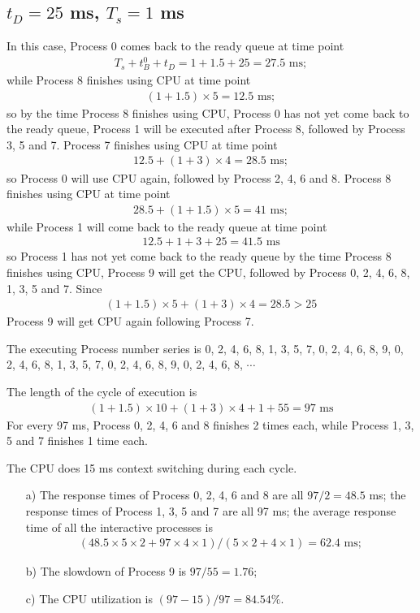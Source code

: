 \documentclass[12pt,letterpaper]{article}
\begin{document}
\subsection{$t_D=25$ ms, $T_s = 1$ ms}
In this case, Process 0 comes back to the ready queue at time point
\begin{eqnarray}
T_s+t_B^0+t_D=1+1.5+25=27.5\textrm{ ms};
\end{eqnarray}
while Process 8 finishes using CPU at time point 
\begin{eqnarray}
(1+1.5)\times5=12.5\textrm{ ms};
\end{eqnarray}
so by the time Process 8 finishes using CPU, Process 0 has not yet come back to the ready queue, Process 1 will be executed after Process 8, followed by Process 3, 5 and 7. Process 7 finishes using CPU at time point
\begin{eqnarray}
12.5+(1+3)\times4=28.5\textrm{ ms};
\end{eqnarray}
so Process 0 will use CPU again, followed by Process 2, 4, 6 and 8. Process 8 finishes using CPU at time point
\begin{eqnarray}
28.5+(1+1.5)\times5=41\textrm{ ms};
\end{eqnarray}
while Process 1 will come back to the ready queue at time point
\begin{eqnarray}
12.5+1+3+25=41.5\textrm{ ms}
\end{eqnarray}
so Process 1 has not yet come back to the ready queue by the time Process 8 finishes using CPU, Process 9 will get the CPU, followed by Process 0, 2, 4, 6, 8, 1, 3, 5 and 7. Since
\begin{eqnarray}
(1+1.5)\times5+(1+3)\times4=28.5>25
\end{eqnarray}
Process 9 will get CPU again following Process 7.

The executing Process number series is 0, 2, 4, 6, 8, 1, 3, 5, 7, 0, 2, 4, 6, 8, 9, 0, 2, 4, 6, 8, 1, 3, 5, 7, 0, 2, 4, 6, 8, 9, 0, 2, 4, 6, 8, $\cdots$

The length of the cycle of execution is 
\begin{eqnarray}
(1+1.5)\times10+(1+3)\times4+1+55=97\textrm{ ms}
\end{eqnarray}
For every 97 ms, Process 0, 2, 4, 6 and 8 finishes 2 times each, while Process 1, 3, 5 and 7 finishes 1 time each.

The CPU does 15 ms context switching during each cycle.

\begin{enumerate}
\item[a)] The response times of Process 0, 2, 4, 6 and 8 are all $97/2=48.5$ ms; the response times of Process 1, 3, 5 and 7 are all 97 ms; the average response time of all the interactive processes is 
\begin{eqnarray}
(48.5\times5\times2+97\times4\times1)/(5\times2+4\times1)=62.4\textrm{ ms};
\end{eqnarray}
\item[b)] The slowdown of Process 9 is $97/55=1.76$;
\item[c)] The CPU utilization is $(97-15)/97=84.54\%$.
\end{enumerate}
\end{document}
